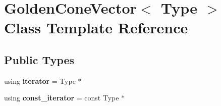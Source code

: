 \hypertarget{class_golden_cone_vector}{}\section{Golden\+Cone\+Vector$<$ Type $>$ Class Template Reference}
\label{class_golden_cone_vector}
\subsection*{Public Types}
\begin{DoxyCompactItemize}
\item 
\mbox{\label{class_golden_cone_vector_a12d32794f339d73ceabc4081d2eb1b05}} 
using {\bfseries iterator} = Type $\ast$
\item 
\mbox{\label{class_golden_cone_vector_a4c8b76545a9abcb250d930e7f8f573d9}} 
using {\bfseries const\+\_\+iterator} = const Type $\ast$
\end{DoxyCompactItemize}
